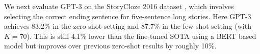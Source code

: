 We next evaluate GPT-3 on the StoryCloze 2016 dataset \cite{mostafazadeh2016corpus}, which involves selecting the correct ending sentence for five-sentence long stories.  Here GPT-3 achieves 83.2\% in the zero-shot setting and 87.7\% in the few-shot setting (with $K=70$). This is still 4.1\% lower than the fine-tuned SOTA using a BERT based model \cite{li2019story} but improves over previous zero-shot results by roughly 10\%.


